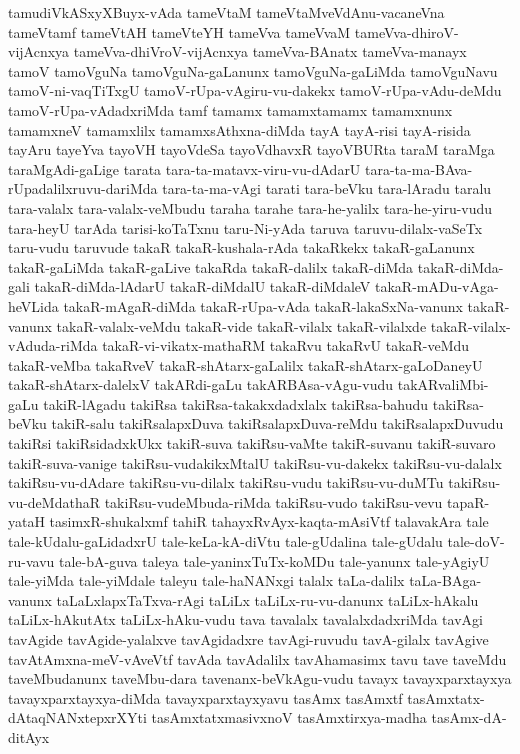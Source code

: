 {tamudiVkASxyXBuyx-vAda
tameVtaM
tameVtaMveVdAnu-vacaneVna
tameVtamf
tameVtAH
tameVteYH
tameVva
tameVvaM
tameVva-dhiroV-vijAcnxya
tameVva-dhiVroV-vijAcnxya
tameVva-BAnatx
tameVva-manayx
tamoV
tamoVguNa
tamoVguNa-gaLanunx
tamoVguNa-gaLiMda
tamoVguNavu
tamoV-ni-vaqTiTxgU
tamoV-rUpa-vAgiru-vu-dakekx
tamoV-rUpa-vAdu-deMdu
tamoV-rUpa-vAdadxriMda
tamf
tamamx
tamamxtamamx
tamamxnunx
tamamxneV
tamamxlilx
tamamxsAthxna-diMda
tayA
tayA-risi
tayA-risida
tayAru
tayeYva
tayoVH
tayoVdeSa
tayoVdhavxR
tayoVBURta
taraM
taraMga
taraMgAdi-gaLige
tarata
tara-ta-matavx-viru-vu-dAdarU
tara-ta-ma-BAva-rUpadalilxruvu-dariMda
tara-ta-ma-vAgi
tarati
tara-beVku
tara-lAradu
taralu
tara-valalx
tara-valalx-veMbudu
taraha
tarahe
tara-he-yalilx
tara-he-yiru-vudu
tara-heyU
tarAda
tarisi-koTaTxnu
taru-Ni-yAda
taruva
taruvu-dilalx-vaSeTx
taru-vudu
taruvude
takaR
takaR-kushala-rAda
takaRkekx
takaR-gaLanunx
takaR-gaLiMda
takaR-gaLive
takaRda
takaR-dalilx
takaR-diMda
takaR-diMda-gali
takaR-diMda-lAdarU
takaR-diMdalU
takaR-diMdaleV
takaR-mADu-vAga-heVLida
takaR-mAgaR-diMda
takaR-rUpa-vAda
takaR-lakaSxNa-vanunx
takaR-vanunx
takaR-valalx-veMdu
takaR-vide
takaR-vilalx
takaR-vilalxde
takaR-vilalx-vAduda-riMda
takaR-vi-vikatx-mathaRM
takaRvu
takaRvU
takaR-veMdu
takaR-veMba
takaRveV
takaR-shAtarx-gaLalilx
takaR-shAtarx-gaLoDaneyU
takaR-shAtarx-dalelxV
takARdi-gaLu
takARBAsa-vAgu-vudu
takARvaliMbi-gaLu
takiR-lAgadu
takiRsa
takiRsa-takakxdadxlalx
takiRsa-bahudu
takiRsa-beVku
takiR-salu
takiRsalapxDuva
takiRsalapxDuva-reMdu
takiRsalapxDuvudu
takiRsi
takiRsidadxkUkx
takiR-suva
takiRsu-vaMte
takiR-suvanu
takiR-suvaro
takiR-suva-vanige
takiRsu-vudakikxMtalU
takiRsu-vu-dakekx
takiRsu-vu-dalalx
takiRsu-vu-dAdare
takiRsu-vu-dilalx
takiRsu-vudu
takiRsu-vu-duMTu
takiRsu-vu-deMdathaR
takiRsu-vudeMbuda-riMda
takiRsu-vudo
takiRsu-vevu
tapaR-yataH
tasimxR-shukalxmf
tahiR
tahayxRvAyx-kaqta-mAsiVtf
talavakAra
tale
tale-kUdalu-gaLidadxrU
tale-keLa-kA-diVtu
tale-gUdalina
tale-gUdalu
tale-doV-ru-vavu
tale-bA-guva
taleya
tale-yaninxTuTx-koMDu
tale-yanunx
tale-yAgiyU
tale-yiMda
tale-yiMdale
taleyu
tale-haNANxgi
talalx
taLa-dalilx
taLa-BAga-vanunx
taLaLxlapxTaTxva-rAgi
taLiLx
taLiLx-ru-vu-danunx
taLiLx-hAkalu
taLiLx-hAkutAtx
taLiLx-hAku-vudu
tava
tavalalx
tavalalxdadxriMda
tavAgi
tavAgide
tavAgide-yalalxve
tavAgidadxre
tavAgi-ruvudu
tavA-gilalx
tavAgive
tavAtAmxna-meV-vAveVtf
tavAda
tavAdalilx
tavAhamasimx
tavu
tave
taveMdu
taveMbudanunx
taveMbu-dara
tavenanx-beVkAgu-vudu
tavayx
tavayxparxtayxya
tavayxparxtayxya-diMda
tavayxparxtayxyavu
tasAmx
tasAmxtf
tasAmxtatx-dAtaqNANxtepxrXYti
tasAmxtatxmasivxnoV
tasAmxtirxya-madha
tasAmx-dA-ditAyx
}
